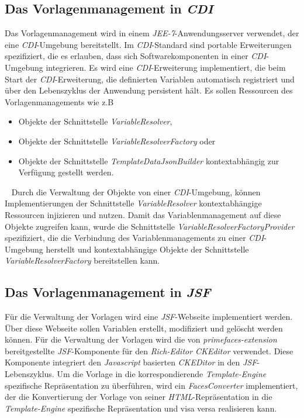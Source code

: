 \subsection{Das Vorlagenmanagement in \emph{CDI}}
\label{sec:sub-template-management-cdi}
Das Vorlagenmanagement wird in einem \emph{JEE-7}-Anwendungsserver verwendet, der eine \emph{CDI}-Umgebung bereitstellt. Im \emph{CDI}-Standard sind portable Erweiterungen  spezifiziert, die es erlauben, dass sich Softwarekomponenten in einer \emph{CDI}-Umgebung integrieren. Es wird eine \emph{CDI}-Erweiterung implementiert, die beim Start der \emph{CDI}-Erweiterung, die definierten Variablen automatisch registriert und über den Lebenszyklus der Anwendung persistent hält. Es sollen Ressourcen des Vorlagenmanagements wie z.B
\begin{itemize}
	\item Objekte der Schnittstelle \emph{VariableResolver},
	\item Objekte der Schnittstelle \emph{VariableResolverFactory} oder
	\item Objekte der Schnittstelle \emph{TemplateDataJsonBuilder} kontextabhängig zur Verfügung gestellt werden.
\end{itemize}
\ \newline
Durch die Verwaltung der Objekte von einer \emph{CDI}-Umgebung, können Implementierungen der Schnittstelle \emph{VariableResolver} kontextabhängige Ressourcen injizieren und nutzen. Damit das Variablenmanagement auf diese Objekte zugreifen kann, wurde die Schnittstelle \emph{VariableResolverFactoryProvider} spezifiziert, die die Verbindung des Variablenmanagements zu einer \emph{CDI}-Umgebung herstellt und kontextabhängige Objekte der Schnittstelle \emph{VariableResolverFactory} bereitstellen kann.

\subsection{Das Vorlagenmanagement in \emph{JSF}}
Für die Verwaltung der Vorlagen wird eine \emph{JSF}-Webseite implementiert werden. Über diese Webseite sollen Variablen erstellt, modifiziert und gelöscht werden können. Für die Verwaltung der Vorlagen wird die von \emph{primefaces-extension} bereitgestellte \emph{JSF}-Komponente für den \emph{Rich-Editor CKEditor} verwendet. Diese Komponente integriert den \emph{Javascript} basierten \emph{CKEDitor} in den \emph{JSF}-Lebenszyklus. Um die Vorlage in die korrespondierende \emph{Template-Engine} spezifische Repräsentation zu überführen, wird ein \emph{FacesConverter} implementiert, der die Konvertierung der Vorlage von seiner \emph{HTML}-Repräsentation in die \emph{Template-Engine} spezifische Repräsentation und visa versa realisieren kann.

